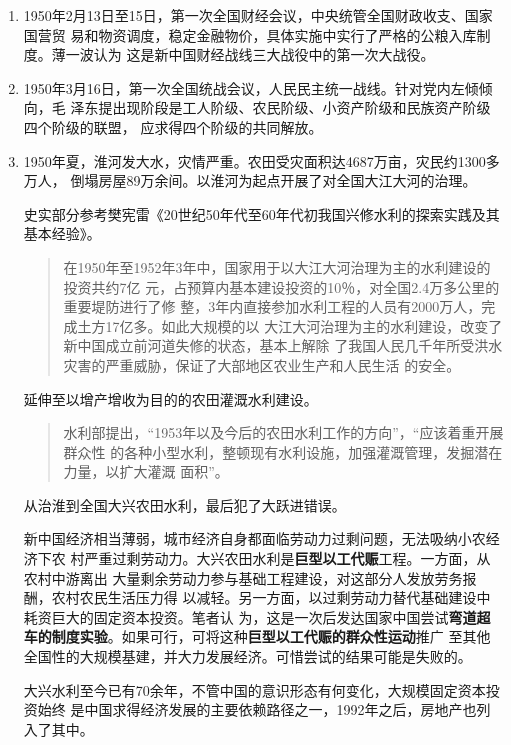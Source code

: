 \begin{enumerate}

\item 1950年2月13日至15日，第一次全国财经会议，中央统管全国财政收支、国家国营贸
  易和物资调度，稳定金融物价，具体实施中实行了严格的公粮入库制度。薄一波认为
  这是新中国财经战线三大战役中的第一次大战役。

\item 1950年3月16日，第一次全国统战会议，人民民主统一战线。针对党内左倾倾向，毛
  泽东提出现阶段是工人阶级、农民阶级、小资产阶级和民族资产阶级四个阶级的联盟，
  应求得四个阶级的共同解放。

\item 1950年夏，淮河发大水，灾情严重。农田受灾面积达4687万亩，灾民约1300多万人，
  倒塌房屋89万余间。以淮河为起点开展了对全国大江大河的治理。

  史实部分参考樊宪雷《20世纪50年代至60年代初我国兴修水利的探索实践及其基本经验》。
  \begin{quotation}
    在1950年至1952年3年中，国家用于以大江大河治理为主的水利建设的投资共约7亿
    元，占预算内基本建设投资的10％，对全国2.4万多公里的重要堤防进行了修
    整，3年内直接参加水利工程的人员有2000万人，完成土方17亿多。如此大规模的以
    大江大河治理为主的水利建设，改变了新中国成立前河道失修的状态，基本上解除
    了我国人民几千年所受洪水灾害的严重威胁，保证了大部地区农业生产和人民生活
    的安全。
  \end{quotation}
  延伸至以增产增收为目的的农田灌溉水利建设。
  \begin{quotation}
    水利部提出，“1953年以及今后的农田水利工作的方向”，“应该着重开展群众性
    的各种小型水利，整顿现有水利设施，加强灌溉管理，发掘潜在力量，以扩大灌溉
    面积”。
  \end{quotation}
  从治淮到全国大兴农田水利，最后犯了大跃进错误。

  新中国经济相当薄弱，城市经济自身都面临劳动力过剩问题，无法吸纳小农经济下农
  村严重过剩劳动力。大兴农田水利是\textbf{巨型以工代赈}工程。一方面，从农村中游离出
  大量剩余劳动力参与基础工程建设，对这部分人发放劳务报酬，农村农民生活压力得
  以减轻。另一方面，以过剩劳动力替代基础建设中耗资巨大的固定资本投资。笔者认
  为，这是一次后发达国家中国尝试\textbf{弯道超车的制度实验}。如果可行，可将这种\textbf{巨型以工代赈的群众性运动}推广
  至其他全国性的大规模基建，并大力发展经济。可惜尝试的结果可能是失败的。

  大兴水利至今已有70余年，不管中国的意识形态有何变化，大规模固定资本投资始终
  是中国求得经济发展的主要依赖路径之一，1992年之后，房地产也列入了其中。


\end{enumerate}
